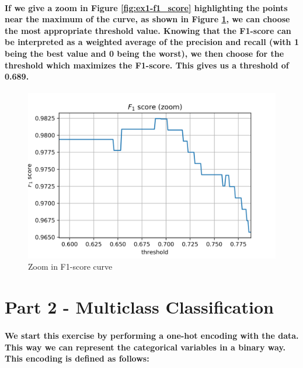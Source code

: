 \documentclass[a4paper]{article}    %
\begin{document}
\paragraph{If we give a zoom in Figure \ref{fig:ex1-f1_score} highlighting the points near the maximum of the curve, as shown in Figure \ref{fig:ex1-f1_score_zoom}, we can choose the most appropriate threshold value. Knowing that the F1-score can be interpreted as a weighted average of the precision and recall (with 1 being the best value and 0 being the worst), we then choose for the threshold which maximizes the F1-score. This gives us a threshold of 0.689.}

\begin{figure}[H]
    \centering
    \includegraphics[width=12cm]{F1_score_zoom}
    \caption{Zoom in F1-score curve}
    \label{fig:ex1-f1_score_zoom}
\end{figure}
\newpage

\section{Part 2 - Multiclass Classification}

\paragraph{We start this exercise by performing a one-hot encoding with the data. This way we can represent the categorical variables in a binary way. This encoding is defined as follows:}
\end{document}
